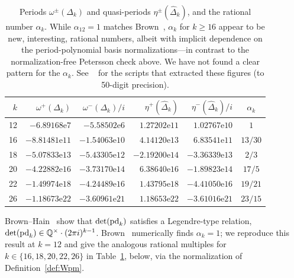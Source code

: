 \documentclass[11pt]{article}
\newcommand{\QQ}{\mathbb{Q}}
\newcommand{\Dhat}{\widehat{\Delta}}
\begin{document}
\begin{table}[H]\centering\small
\begin{tabular}{r|rrrr|c}
$k$ & $\omega^+(\Delta_k)$ & $\omega^-(\Delta_k)/i$ & $\eta^+(\Dhat_k)$ & $\eta^-(\Dhat_k)/i$ & $\alpha_k$\\\hline
12 & $-6.89168\mathrm{e}7$  & $-5.58502\mathrm{e}6$  & $1.27202\mathrm{e}{11}$ & $1.02767\mathrm{e}{10}$  & $1$\\
16 & $-8.81481\mathrm{e}{11}$ & $-1.54063\mathrm{e}{10}$ & $4.14120\mathrm{e}{13}$ & $6.83541\mathrm{e}{11}$ & $13/30$\\
18 & $-5.07833\mathrm{e}{13}$ & $-5.43305\mathrm{e}{12}$ & $-2.19200\mathrm{e}{14}$ & $-3.36339\mathrm{e}{13}$ & $2/3$\\
20 & $-4.22882\mathrm{e}{16}$ & $-3.73170\mathrm{e}{14}$ & $6.38640\mathrm{e}{16}$ & $-1.89823\mathrm{e}{14}$ & $17/5$\\
22 & $-1.49974\mathrm{e}{18}$ & $-4.24489\mathrm{e}{16}$ & $1.43795\mathrm{e}{18}$ & $-4.41050\mathrm{e}{16}$ & $19/21$\\
26 & $-1.18673\mathrm{e}{22}$ & $-3.60961\mathrm{e}{21}$ & $1.18653\mathrm{e}{22}$ & $-3.61016\mathrm{e}{21}$ & $23/15$\\
\end{tabular}\caption{Periods $\omega^\pm(\Delta_k)$ and quasi-periods 
$\eta^\pm(\Dhat_k)$, and the rational number $\alpha_k$. While 
$\alpha_{12} = 1$ matches Brown~\cite{Brown2017}, $\alpha_k$ for $k\ge16$ 
appear to be new, interesting, rational numbers, albeit with implicit dependence
on the period-polynomial basis normalizations---in contrast to the normalization-free
Petersson check above. We have not found a clear pattern
for the $\alpha_k$. See ~\cite{VerifyScripts} for the scripts that extracted these 
figures (to 50-digit precision).
}\label{tab:periods}
\end{table}

Brown--Hain~\cite[Prop.~5.6]{BrownHain2018} show that $\det({\rm pd}_k)$ satisfies a 
Legendre-type relation, $\det({\rm pd}_k)\in\QQ^\times\cdot(2\pi i)^{k-1}$. Brown~\cite[\S8.3]{Brown2017}
numerically finds $\alpha_k=1$; we reproduce this result at $k=12$ and give the analogous
rational multiples for $k \in \{16, 18, 20, 22, 26\}$ in Table~\ref{tab:periods}, below,
via the normalization of Definition~\ref{def:Wpm}. 
\end{document}
